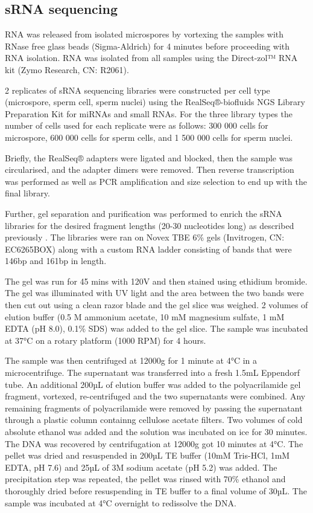 \subsection{sRNA sequencing}

RNA was released from isolated microspores by vortexing the samples with RNase free glass beads (Sigma-Aldrich) for 4 minutes before proceeding with RNA isolation. RNA was isolated from all samples using the Direct-zol™ RNA kit (Zymo Research, CN: R2061).

2 replicates of sRNA sequencing libraries were constructed per cell type (microspore, sperm cell, sperm nuclei) using the RealSeq®-biofluids NGS Library Preparation Kit for miRNAs and small RNAs. For the three library types the number of cells used for each replicate were as follows: 300 000 cells for microspore, 600 000 cells for sperm cells, and 1 500 000 cells for sperm nuclei.

Briefly, the RealSeq® adapters were ligated and blocked, then the sample was circularised, and the adapter dimers were removed. Then reverse transcription was performed as well as PCR amplification and size selection to end up with the final library.

Further, gel separation  and purification was performed to enrich the sRNA libraries for the desired fragment lengths (20-30 nucleotides long) as described previously \citep{RN187}. The libraries were ran on Novex TBE 6\% gels (Invitrogen, CN: EC6265BOX) along with a custom RNA ladder consisting of bands that were 146bp and 161bp in length. 

The gel was run for 45 mins with 120V and then stained using ethidium bromide. The gel was illuminated with UV light and the area between the two bands were then cut out using a clean razor blade and the gel slice was weighed. 2 volumes of elution buffer (0.5 M ammonium acetate, 10 mM magnesium sulfate, 1 mM EDTA (pH 8.0), 0.1\% SDS) was added to the gel slice. The sample was incubated at 37°C on a rotary platform (1000 RPM) for 4 hours. 

The sample was then centrifuged at 12000g for 1 minute at 4°C in a microcentrifuge. The supernatant was transferred into a fresh 1.5mL Eppendorf tube. An additional 200µL of elution buffer was added to the polyacrilamide gel fragment, vortexed, re-centrifuged and the two supernatants were combined. Any remaining fragments of polyacrilamide were removed  by passing the supernatant through a plastic column containng cellulose acetate filters. Two volumes of cold absolute ethanol was added and the solution was incubated on ice for 30 minutes. The DNA was recovered by centrifugation at 12000g got 10 minutes at 4°C. The pellet was dried and resuspended in 200µL TE buffer (10mM Tris-HCl, 1mM EDTA, pH 7.6) and 25µL of 3M sodium acetate (pH 5.2) was added. The precipitation step was repeated, the pellet was rinsed with 70\% ethanol and thoroughly dried before resuspending in TE buffer to a final volume of 30µL. The sample was incubated at 4°C overnight to redissolve the DNA.

